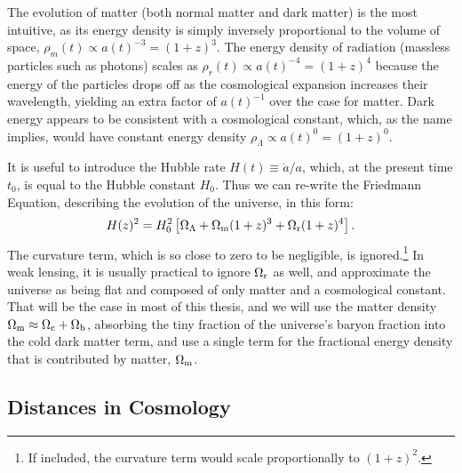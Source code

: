 The evolution of matter (both normal matter and dark matter) is the most intuitive, as its energy density is simply inversely proportional to the volume of space, $\rho_m(t) \propto a(t)^{-3} = (1+z)^{3}$. The energy density of radiation (massless particles such as photons) scales as $\rho_r(t) \propto a(t)^{-4} = (1+z)^{4}$ because the energy of the particles drops off as the cosmological expansion increases their wavelength, yielding an extra factor of $a(t)^{-1}$ over the case for matter. Dark energy appears to be consistent with a cosmological constant, which, as the name implies, would have constant energy density $\rho_{\Lambda} \propto a(t)^{0} = (1+z)^{0}$.

It is useful to introduce the Hubble rate $H(t) \equiv {\dot a}/a$, which, at the present time $t_0$, is equal to the Hubble constant $H_0$. Thus we can re-write the Friedmann Equation, describing the evolution of the universe, in this form:
\begin{equation}
H(z)^2 = H_0^2 \left[ \Omega_{\Lambda} + \Omega_{\rm m}(1+z)^3 + \Omega_{\rm r} (1+z)^4 \right].
\end{equation}
The curvature term, which is so close to zero to be negligible, is ignored.\footnote{If included, the curvature term would scale proportionally to $(1+z)^2$.} In weak lensing, it is usually practical to ignore $\Omega_{\rm r}$ as well, and approximate the universe as being flat and composed of only matter and a cosmological constant. That will be the case in most of this thesis, and we will use the matter density $\Omega_{\rm m} \approx \Omega_{\rm c} + \Omega_{\rm b}$, absorbing the tiny fraction of the universe's baryon fraction into the cold dark matter term, and use a single term for the fractional energy density that is contributed by matter, $\Omega_{\rm m}$. 



\subsection{Distances in Cosmology}
\label{sec:distances}

